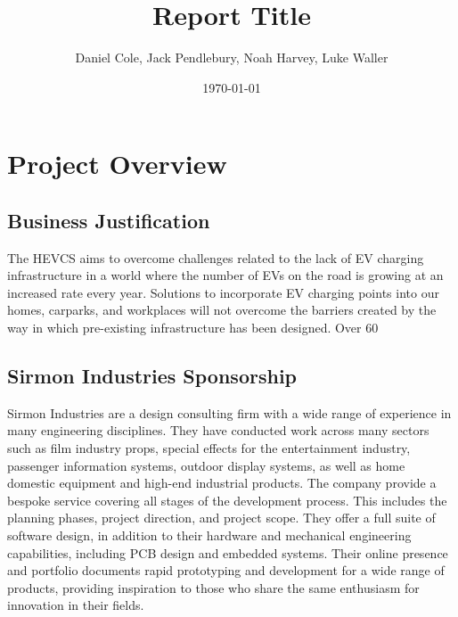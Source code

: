 \documentclass [12pt]{article}
\begin{document}
\title{\bf Report Title}
\author{Daniel Cole, Jack Pendlebury, Noah Harvey, Luke Waller}
\date{\today}
\maketitle
\thispagestyle{empty}

\newpage
{}
\setcounter{page}{1}
\tableofcontents
\newpage

\newpage
\section{Project Overview}\label{sec:section_1}
\subsection{Business Justification}\label{sec:business_justification}
The HEVCS aims to overcome challenges related to the lack of EV charging infrastructure in a world where the number of EVs on the road is growing at an increased rate every year. Solutions to incorporate EV charging points into our homes, carparks, and workplaces will not overcome the barriers created by the way in which pre-existing infrastructure has been designed. Over 60%

\subsection{Sirmon Industries Sponsorship}\label{sec:sponsorship}
Sirmon Industries are a design consulting firm with a wide range of experience in many engineering disciplines. They have conducted work across many sectors such as film industry props, special effects for the entertainment industry, passenger information systems, outdoor display systems, as well as home domestic equipment and high-end industrial products. The company provide a bespoke service covering all stages of the development process. This includes the planning phases, project direction, and project scope. They offer a full suite of software design, in addition to their hardware and mechanical engineering capabilities, including PCB design and embedded systems. Their online presence and portfolio documents rapid prototyping and development for a wide range of products, providing inspiration to those who share the same enthusiasm for innovation in their fields.
\end{document}
